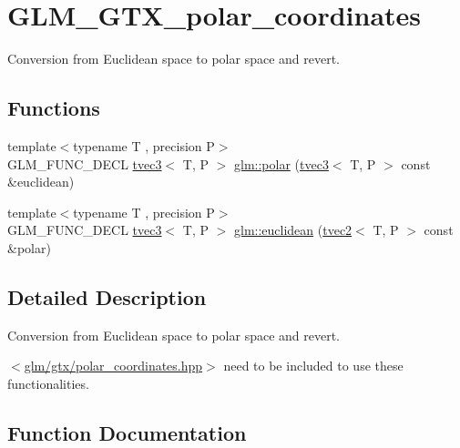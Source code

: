 \hypertarget{group__gtx__polar__coordinates}{}\section{G\+L\+M\+\_\+\+G\+T\+X\+\_\+polar\+\_\+coordinates}
\label{group__gtx__polar__coordinates}


Conversion from Euclidean space to polar space and revert.  


\subsection*{Functions}
\begin{DoxyCompactItemize}
\item 
{\footnotesize template$<$typename T , precision P$>$ }\\G\+L\+M\+\_\+\+F\+U\+N\+C\+\_\+\+D\+E\+CL \hyperlink{structglm_1_1tvec3}{tvec3}$<$ T, P $>$ \hyperlink{group__gtx__polar__coordinates_gafcf95a38c780a4ad5ba14c8ac9e522bb}{glm\+::polar} (\hyperlink{structglm_1_1tvec3}{tvec3}$<$ T, P $>$ const \&euclidean)
\item 
{\footnotesize template$<$typename T , precision P$>$ }\\G\+L\+M\+\_\+\+F\+U\+N\+C\+\_\+\+D\+E\+CL \hyperlink{structglm_1_1tvec3}{tvec3}$<$ T, P $>$ \hyperlink{group__gtx__polar__coordinates_ga45ece1fbf7260c43e0f873c498202581}{glm\+::euclidean} (\hyperlink{structglm_1_1tvec2}{tvec2}$<$ T, P $>$ const \&polar)
\end{DoxyCompactItemize}


\subsection{Detailed Description}
Conversion from Euclidean space to polar space and revert. 

$<$\hyperlink{polar__coordinates_8hpp}{glm/gtx/polar\+\_\+coordinates.\+hpp}$>$ need to be included to use these functionalities. 

\subsection{Function Documentation}
\mbox{\label{group__gtx__polar__coordinates_ga45ece1fbf7260c43e0f873c498202581}} 
